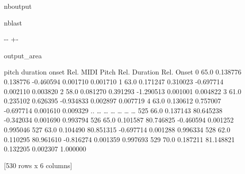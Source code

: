 \documentclass[letterpaper,10pt,english]{sphinxmanual}
\newlength\nbsphinxcodecellspacing
\begin{document}
\begin{sphinxuseclass}{nboutput}
\begin{sphinxuseclass}{nblast}
{

\kern-\sphinxverbatimsmallskipamount\kern-\baselineskip
\kern+\FrameHeightAdjust\kern-\fboxrule
\vspace{\nbsphinxcodecellspacing}

\begin{sphinxuseclass}{output_area}
\begin{sphinxuseclass}{}


\begin{sphinxVerbatim}[commandchars=\\\{\}]
\llap{\color{nbsphinxout}[37]:\,\hspace{\fboxrule}\hspace{\fboxsep}}     pitch  duration      onset  Rel. MIDI Pitch  Rel. Duration  Rel. Onset
0     65.0  0.138776   0.138776        -0.460594       0.001710    0.001710
1     63.0  0.171247   0.310023        -0.697714       0.002110    0.003820
2     58.0  0.081270   0.391293        -1.290513       0.001001    0.004822
3     61.0  0.235102   0.626395        -0.934833       0.002897    0.007719
4     63.0  0.130612   0.757007        -0.697714       0.001610    0.009329
..     {\ldots}       {\ldots}        {\ldots}              {\ldots}            {\ldots}         {\ldots}
525   66.0  0.137143  80.645238        -0.342034       0.001690    0.993794
526   65.0  0.101587  80.746825        -0.460594       0.001252    0.995046
527   63.0  0.104490  80.851315        -0.697714       0.001288    0.996334
528   62.0  0.110295  80.961610        -0.816274       0.001359    0.997693
529   70.0  0.187211  81.148821         0.132205       0.002307    1.000000

[530 rows x 6 columns]
\end{sphinxVerbatim}



\end{sphinxuseclass}
\end{sphinxuseclass}
}

\end{sphinxuseclass}
\end{sphinxuseclass}
\end{document}
